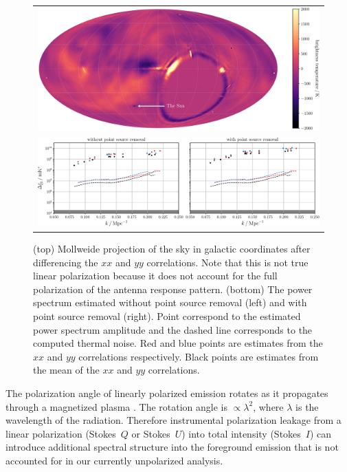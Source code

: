 \documentclass[twocolumn]{aastex62}
\begin{document}
\begin{figure}
    \centering
    \begin{tabular}{c}
        \includegraphics[width=\textwidth]{xx-yy-sky-map-colorbar}\\
        \includegraphics[width=\textwidth]{spherical-power-spectrum-xx-yy}\\
    \end{tabular}
    \caption{
        (top) Mollweide projection of the sky in galactic coordinates after differencing the $xx$
        and $yy$ correlations. Note that this is not true linear polarization because it does not
        account for the full polarization of the antenna response pattern.
        (bottom) The power spectrum estimated without point source removal (left) and with point
        source removal (right). Point correspond to the estimated power spectrum amplitude and the
        dashed line corresponds to the computed thermal noise. Red and blue points are estimates
        from the $xx$ and $yy$ correlations respectively. Black points are estimates from the mean
        of the $xx$ and $yy$ correlations.
    }
    \label{fig:spherical-power-spectrum-xx-yy}
\end{figure}

The polarization angle of linearly polarized emission rotates as it propagates through a magnetized
plasma \citep[e.g.,][]{2014A&A...568A.101J}. The rotation angle is $\propto\lambda^2$, where
$\lambda$ is the wavelength of the radiation. Therefore instrumental polarization leakage from a
linear polarization (Stokes~$Q$ or Stokes~$U$) into total intensity (Stokes~$I$) can introduce
additional spectral structure into the foreground emission that is not accounted for in our
currently unpolarized analysis.
\end{document}
